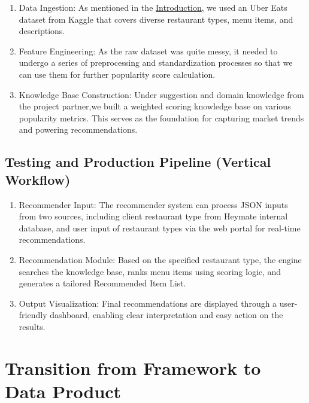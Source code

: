 \documentclass[
  11pt,
  a4paper,
  DIV=11,
  numbers=noendperiod]{scrartcl}
\providecommand{\tightlist}{%
  \setlength{\itemsep}{0pt}\setlength{\parskip}{0pt}}\usepackage{longtable,booktabs,array}
\begin{document}
\begin{enumerate}
\def\labelenumi{\arabic{enumi}.}
\tightlist
\item
  Data Ingestion: As mentioned in the
  \hyperref[introduction]{Introduction}, we used an Uber Eats dataset
  from Kaggle that covers diverse restaurant types, menu items, and
  descriptions.
\item
  Feature Engineering: As the raw dataset was quite messy, it needed to
  undergo a series of preprocessing and standardization processes so
  that we can use them for further popularity score calculation.
\item
  Knowledge Base Construction: Under suggestion and domain knowledge
  from the project partner,we built a weighted scoring knowledge base on
  various popularity metrics. This serves as the foundation for
  capturing market trends and powering recommendations.
\end{enumerate}

\subsection{Testing and Production Pipeline (Vertical
Workflow)}\label{testing-and-production-pipeline-vertical-workflow}

\begin{enumerate}
\def\labelenumi{\arabic{enumi}.}
\tightlist
\item
  Recommender Input: The recommender system can process JSON inputs from
  two sources, including client restaurant type from Heymate internal
  database, and user input of restaurant types via the web portal for
  real-time recommendations.
\item
  Recommendation Module: Based on the specified restaurant type, the
  engine searches the knowledge base, ranks menu items using scoring
  logic, and generates a tailored Recommended Item List.
\item
  Output Visualization: Final recommendations are displayed through a
  user-friendly dashboard, enabling clear interpretation and easy action
  on the results.
\end{enumerate}

\newpage

\section{Transition from Framework to Data
Product}\label{transition-from-framework-to-data-product}
\end{document}
